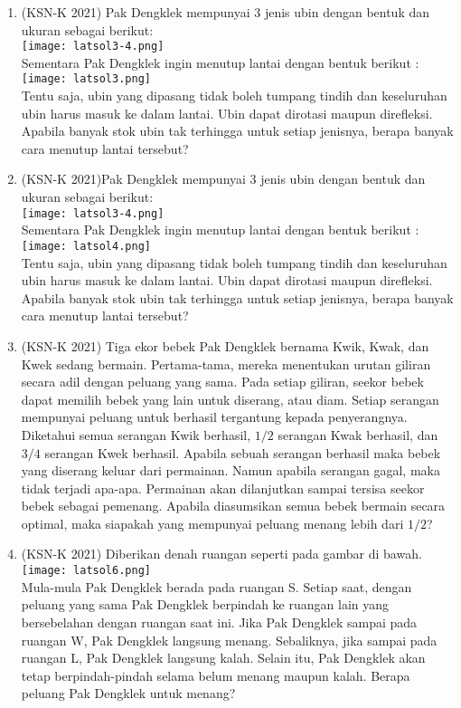 \begin{enumerate}
	 	    \item (KSN-K 2021) Pak Dengklek mempunyai 3 jenis ubin dengan bentuk dan ukuran sebagai berikut:\\
	 	    	\texttt{[image: latsol3-4.png]}\\
	 	    Sementara Pak Dengklek ingin menutup lantai dengan bentuk berikut :\\
	 	    	\texttt{[image: latsol3.png]}\\
	 	    Tentu saja, ubin yang dipasang tidak boleh tumpang tindih dan keseluruhan ubin harus 
	 	    masuk ke dalam lantai. Ubin dapat dirotasi maupun direfleksi. Apabila banyak stok ubin 
	 	    tak terhingga untuk setiap jenisnya, berapa banyak cara menutup lantai tersebut?
	 	    
	 	    \item (KSN-K 2021)Pak Dengklek mempunyai 3 jenis ubin dengan bentuk dan ukuran sebagai berikut:\\
	 	     	 \texttt{[image: latsol3-4.png]}\\
	 	    Sementara Pak Dengklek ingin menutup lantai dengan bentuk berikut :\\
	 	    	\texttt{[image: latsol4.png]}\\
	 	    Tentu saja, ubin yang dipasang tidak boleh tumpang tindih dan keseluruhan ubin harus 
	 	    masuk ke dalam lantai. Ubin dapat dirotasi maupun direfleksi. Apabila banyak stok ubin 
	 	    tak terhingga untuk setiap jenisnya, berapa banyak cara menutup lantai tersebut?
	 	    
	 	    \item (KSN-K 2021) Tiga ekor bebek Pak Dengklek bernama Kwik, Kwak, dan Kwek sedang bermain. 
	 	    Pertama-tama, mereka menentukan urutan giliran secara adil dengan peluang yang 
	 	    sama. Pada setiap giliran, seekor bebek dapat memilih bebek yang lain untuk diserang,
	 	    atau diam. Setiap serangan mempunyai peluang untuk berhasil tergantung kepada
	 	    penyerangnya. Diketahui semua serangan Kwik berhasil, $1/2$ serangan Kwak berhasil, dan 
	 	    $3/4$ serangan Kwek berhasil. Apabila sebuah serangan berhasil maka bebek yang diserang 
	 	    keluar dari permainan. Namun apabila serangan gagal, maka tidak terjadi apa-apa.
	 	    Permainan akan dilanjutkan sampai tersisa seekor bebek sebagai pemenang. Apabila 
	 	    diasumsikan semua bebek bermain secara optimal, maka siapakah yang mempunyai 
	 	    peluang menang lebih dari $1/2$?
	 	    
	 	    \item (KSN-K 2021) Diberikan denah ruangan seperti pada gambar di bawah.\\
	 	    	\texttt{[image: latsol6.png]}\\
	 	    Mula-mula Pak Dengklek berada pada ruangan S. Setiap saat, dengan peluang yang 
	 	    sama Pak Dengklek berpindah ke ruangan lain yang bersebelahan dengan ruangan saat 
	 	    ini. Jika Pak Dengklek sampai pada ruangan W, Pak Dengklek langsung menang. 
	 	    Sebaliknya, jika sampai pada ruangan L, Pak Dengklek langsung kalah. Selain itu, Pak 
	 	    Dengklek akan tetap berpindah-pindah selama belum menang maupun kalah. Berapa 
	 	    peluang Pak Dengklek untuk menang?
	 	    

\end{enumerate}
